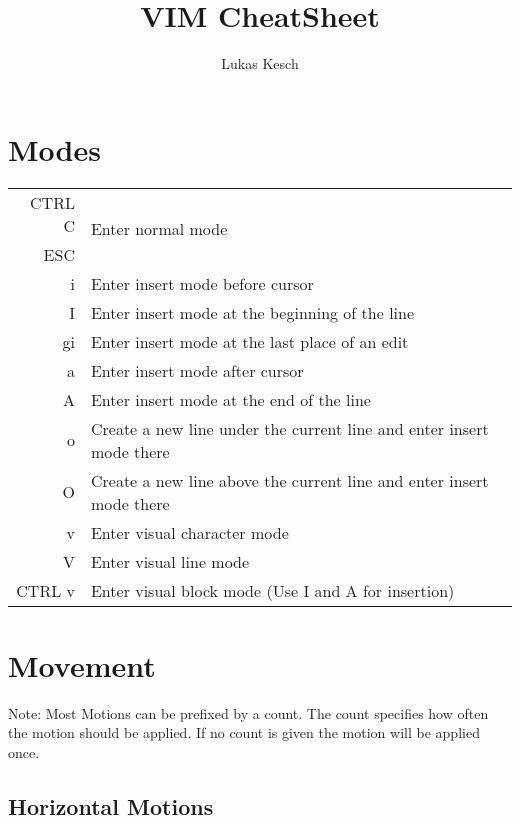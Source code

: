 \documentclass{article}
\title{VIM CheatSheet}
\author{Lukas Kesch}
\begin{document}

\maketitle
\pagebreak
\tableofcontents

\section{Modes}
\begin{tabular}{ r l }
 CTRL C & \multirow{2}{10em}{Enter normal mode} \\[0.5ex]
 ESC & \\[0.5ex]  
 i & Enter insert mode before cursor\\[0.5ex]
 I & Enter insert mode at the beginning of the line\\[0.5ex]
 gi & Enter insert mode at the last place of an edit\\[0.5ex]
 a & Enter insert mode after cursor\\[0.5ex]
 A & Enter insert mode at the end of the line\\[0.5ex]
 o & Create a new line under the current line and enter insert mode there\\[0.5ex]
 O & Create a new line above the current line and enter insert mode there\\[0.5ex]
 v & Enter visual character mode\\[0.5ex]
 V & Enter visual line mode\\[0.5ex]
 CTRL v & Enter visual block mode (Use I and A for insertion)\\[0.5ex]
\end{tabular}


\section{Movement}
Note: Most Motions can be prefixed by a count. The count specifies how often the motion should be applied. If no count is given the motion will be applied once.
\subsection{Horizontal Motions}
\end{document}
